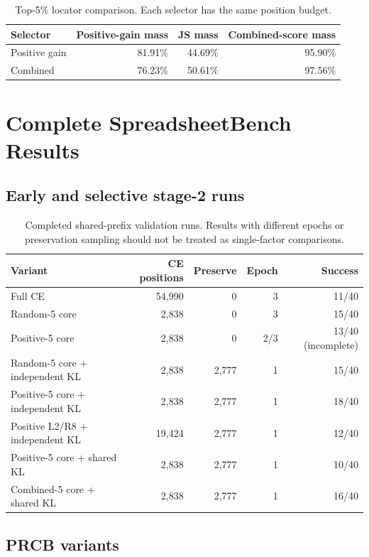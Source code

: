 \begin{table}[h]
\caption{Top-5\% locator comparison.  Each selector has the same position budget.}
\centering
\small
\begin{tabular}{lrrr}
\toprule
Selector & Positive-gain mass & JS mass & Combined-score mass \\
\midrule
Positive gain & 81.91\% & 44.69\% & 95.90\% \\
Combined & 76.23\% & 50.61\% & 97.56\% \\
\bottomrule
\end{tabular}
\end{table}

\clearpage
\section{Complete SpreadsheetBench Results}
\label{app:results}

\subsection{Early and selective stage-2 runs}

\begin{table}[h]
\caption{Completed shared-prefix validation runs.  Results with different epochs or preservation sampling should not be treated as single-factor comparisons.}
\centering
\scriptsize
\begin{tabular}{lrrrr}
\toprule
Variant & CE positions & Preserve & Epoch & Success \\
\midrule
Full CE & 54,990 & 0 & 3 & 11/40 \\
Random-5 core & 2,838 & 0 & 3 & 15/40 \\
Positive-5 core & 2,838 & 0 & 2/3 & 13/40 (incomplete) \\
Random-5 core + independent KL & 2,838 & 2,777 & 1 & 15/40 \\
Positive-5 core + independent KL & 2,838 & 2,777 & 1 & 18/40 \\
Positive L2/R8 + independent KL & 19,424 & 2,777 & 1 & 12/40 \\
Positive-5 core + shared KL & 2,838 & 2,777 & 1 & 10/40 \\
Combined-5 core + shared KL & 2,838 & 2,777 & 1 & 16/40 \\
\bottomrule
\end{tabular}
\end{table}

\FloatBarrier
\subsection{PRCB variants}

